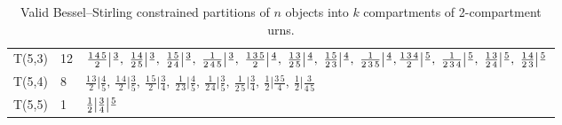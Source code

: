 \documentclass[a4paper]{amsart}
\numberwithin{equation}{section}
\begin{document}
\begin{table}[htbp]
\begin{tabular}{|l|l|p{10.5cm}|}
        T(5,3) & 12 & \texttt{$
            \frac{1\,4\,5}{2}\big|\frac{3}{},\
            \frac{1\,4}{2\,5}\big|\frac{3}{\,},\
            \frac{1\,5}{2\,4}\big|\frac{3}{\,},\
            \frac{1}{2\,4\,5}\big|\frac{3}{\,},\
            \frac{1\,3\,5}{2}\big|\frac{4}{\,},\
            \frac{1\,3}{2\,5}\big|\frac{4}{\,},\
            \frac{1\,5}{2\,3}\big|\frac{4}{\,},\
            \frac{1}{2\,3\,5}\big|\frac{4}{\,},\
            \newline\newline
            \smallskip
            \frac{1\,3\,4}{2}\big|\frac{5}{\,},\
            \frac{1}{2\,3\,4}\big|\frac{5}{\,},\
            \frac{1\,3}{2\,4}\big|\frac{5}{\,},\
            \frac{1\,4}{2\,3}\big|\frac{5}{\,}
        $}\\

        T(5,4) & 8 & \texttt{$
            \frac{1\,3}{2} \big| \frac{4}{5},\
            \frac{1\,4}{2} \big| \frac{3}{5},\
            \frac{1\,5}{2} \big| \frac{3}{4},\
            \frac{1}{2\,3} \big| \frac{4}{5},\
            \frac{1}{2\,4} \big| \frac{3}{5},\
            \frac{1}{2\,5} \big| \frac{3}{4},\
            \frac{1}{2} \big| \frac{3\,5}{4},\
            \frac{1}{2} \big| \frac{3}{4\,5}
        $}\\
        T(5,5) & 1 & \texttt{$
            \frac{1}{2}\big|\frac{3}{4}\big|\frac{5}{\,}
            \smallskip
        $}\\
        \hline
        \end{tabular}
        \bigskip
    \caption{Valid Bessel--Stirling constrained partitions of $n$ objects into $k$ compartments of 2-compartment urns.}
    \label{tab-bs-enumeration}
\end{table}
\egroup
\end{document}
